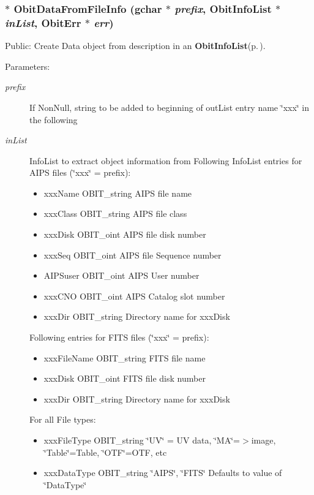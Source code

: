 \subsubsection{$\ast$ Obit\-Data\-From\-File\-Info (gchar $\ast$ {\em prefix}, {\bf Obit\-Info\-List} $\ast$ {\em in\-List}, {\bf Obit\-Err} $\ast$ {\em err})}\label{ObitData_8h_a28}


Public: Create Data object from description in an {\bf Obit\-Info\-List}{\rm (p.\,\pageref{structObitInfoList})}. 

\begin{Desc}
\item[Parameters:]
\begin{description}
\item[{\em prefix}]If Non\-Null, string to be added to beginning of out\-List entry name \char`\"{}xxx\char`\"{} in the following \item[{\em in\-List}]Info\-List to extract object information from Following Info\-List entries for AIPS files (\char`\"{}xxx\char`\"{} = prefix): \begin{itemize}
\item xxx\-Name OBIT\_\-string AIPS file name \item xxx\-Class OBIT\_\-string AIPS file class \item xxx\-Disk OBIT\_\-oint AIPS file disk number \item xxx\-Seq OBIT\_\-oint AIPS file Sequence number \item AIPSuser OBIT\_\-oint AIPS User number \item xxx\-CNO OBIT\_\-oint AIPS Catalog slot number \item xxx\-Dir OBIT\_\-string Directory name for xxx\-Disk\end{itemize}
Following entries for FITS files (\char`\"{}xxx\char`\"{} = prefix): \begin{itemize}
\item xxx\-File\-Name OBIT\_\-string FITS file name \item xxx\-Disk OBIT\_\-oint FITS file disk number \item xxx\-Dir OBIT\_\-string Directory name for xxx\-Disk\end{itemize}
For all File types: \begin{itemize}
\item xxx\-File\-Type OBIT\_\-string \char`\"{}UV\char`\"{} = UV data, \char`\"{}MA\char`\"{}=$>$image, \char`\"{}Table\char`\"{}=Table, \char`\"{}OTF\char`\"{}=OTF, etc \item xxx\-Data\-Type OBIT\_\-string \char`\"{}AIPS\char`\"{}, \char`\"{}FITS\char`\"{} Defaults to value of \char`\"{}Data\-Type\char`\"{}\end{itemize}

\end{description}
\end{Desc}
